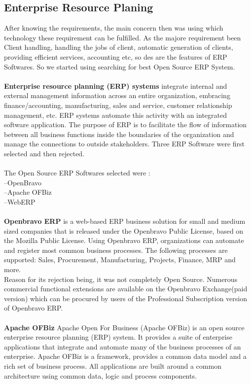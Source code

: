 \subsection{Enterprise Resource Planing}
After knowing the requirements, the main concern then was using which technology these requirement can be fulfilled. As the majore requirement been Client handling, handling the jobs of client, automatic generation of clients, providing efficient services, accounting etc, so des are the features of ERP Softwares. So we started using searching for best Open Source ERP System.\\\\
{\bf Enterprise resource planning (ERP) systems} integrate internal and external management information across an entire organization, embracing finance/accounting, manufacturing, sales and service, customer relationship management, etc. ERP systems automate this activity with an integrated software application. The purpose of ERP is to facilitate the flow of information between all business functions inside the boundaries of the organization and manage the connections to outside stakeholders. Three ERP Software were first selected and then rejected.\\\\ The Open Source ERP Softwares selected were :\\
--OpenBravo\\
--Apache OFBiz\\
--WebERP\\\\
{\bf Openbravo ERP} is a web-based ERP business solution for small and medium sized companies that is released under the Openbravo Public License, based on the Mozilla Public License. Using Openbravo ERP, organizations can automate and register most common business processes. The following processes are supported: Sales, Procurement, Manufacturing, Projects, Finance, MRP and more.\\
Reason for its rejection being, it was not completely Open Source. Numerous commercial functional extensions are available on the Openbravo Exchange(paid version) which can be procured by users of the Professional Subscription version of Openbravo ERP.\\\\
{\bf Apache OFBiz} Apache Open For Business (Apache OFBiz) is an open source enterprise resource planning (ERP) system. It provides a suite of enterprise applications that integrate and automate many of the business processes of an enterprise. Apache OFBiz is a framework, provides a common data model and a rich set of business process. All applications are built around a common architecture using common data, logic and process components.\\

